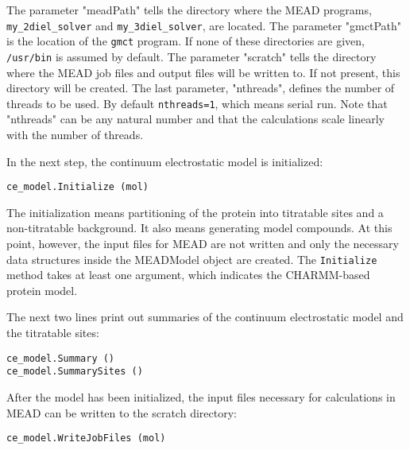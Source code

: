 \documentclass[a4paper,11pt]{article}
\begin{document}
\bigskip
The parameter "meadPath" tells the directory where the MEAD programs, 
\texttt{my\_2diel\_solver} and \texttt{my\_3diel\_solver}, are located.
%
The parameter "gmctPath" is the location of the \texttt{gmct} program.
%
If none of these directories are given, \texttt{/usr/bin} is assumed 
by default.
%
The parameter "scratch" tells the directory where the MEAD job files 
and output files will be written to.
%
If not present, this directory will be created.
%
The last parameter, "nthreads", defines the number of threads to be used.
%
By default \texttt{nthreads=1}, which means serial run.
%
Note that "nthreads" can be any natural number and that the calculations
scale linearly with the number of threads.
%
% 

\bigskip
In the next step, the continuum electrostatic model is initialized:

{\footnotesize \begin{lstlisting}
ce_model.Initialize (mol)
\end{lstlisting} }

\bigskip
The initialization means partitioning of the protein into titratable sites and
a non-titratable background.
%
It also means generating model compounds.
%
At this point, however, the input files for MEAD are not written and only 
the necessary data structures inside the MEADModel object are created.
%
The \texttt{Initialize} method takes at least one argument, 
which indicates the CHARMM-based protein model.

\bigskip
The next two lines print out summaries of the continuum electrostatic
model and the titratable sites:

{\footnotesize \begin{lstlisting}
ce_model.Summary ()
ce_model.SummarySites ()
\end{lstlisting} }

\bigskip
After the model has been initialized, the input files necessary for calculations in MEAD
can be written to the scratch directory:

{\footnotesize \begin{lstlisting}
ce_model.WriteJobFiles (mol)
\end{lstlisting} }
\end{document}
